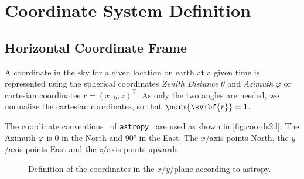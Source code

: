 \documentclass{scrartcl}
\newcommand\azimuth{\ensuremath{\varphi}}
\newcommand\zenith{\ensuremath{\theta}}
\DeclarePairedDelimiter\norm\lVert\rVert
\begin{document}
  \section{Coordinate System Definition}

  \subsection{Horizontal Coordinate Frame}
  A coordinate in the sky for a given location on earth at a given 
  time is represented using the spherical coordinates \emph{Zenith Distance} \zenith{} and \emph{Azimuth} \azimuth{} or cartesian coordinates $\symbf{r} = (x, y, z)^\top$.
  As only the two angles are needed, we normalize the cartesian coordinates, so that $\norm{\symbf{r}} = 1$.

  The coordinate conventions~\cite{astropy-coords} of \texttt{astropy}~\cite{astropy} are used as shown in \autoref{fig:coords2d}:
  The Azimuth \azimuth{} is $0$ in the North and \ang{90} in the East.
  The $x$\-/axis points North, the $y$\-/axis points East and the $z$\-/axis points upwards.

  \begin{figure}[htpb]
  \centering
  
  \caption{Definition of the coordinates in the $x$\-/$y$\-/plane according to astropy.}

  \label{fig:coords2d}
  \end{figure}
  

  \printbibliography
\end{document}
